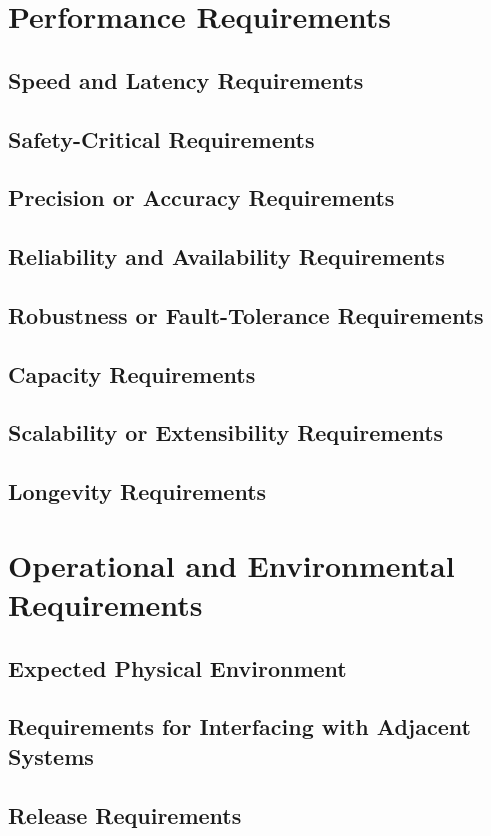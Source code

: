 \documentclass[12pt,a4paper]{article}
\begin{document}
\section{Performance Requirements}
\subsection{Speed and Latency Requirements}
\subsection{Safety-Critical Requirements}
\subsection{Precision or Accuracy Requirements}
\subsection{Reliability and Availability Requirements}
\subsection{Robustness or Fault-Tolerance Requirements}
\subsection{Capacity Requirements}
\subsection{Scalability or Extensibility Requirements}
\subsection{Longevity Requirements}
\pagebreak
\section{Operational and Environmental Requirements}
\subsection{Expected Physical Environment}
\subsection{Requirements for Interfacing with Adjacent Systems}
\subsection{Release Requirements}
\pagebreak
\end{document}
